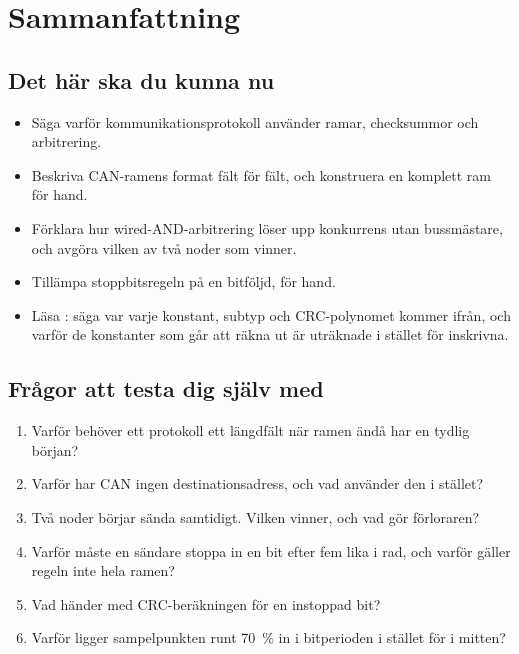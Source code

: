 
\section{Sammanfattning}
\label{c10:sec:review}

\subsection*{Det här ska du kunna nu}
\begin{itemize}
  \item Säga varför kommunikationsprotokoll använder ramar, checksummor och arbitrering.
  \item Beskriva CAN-ramens format fält för fält, och konstruera en komplett ram för hand.
  \item Förklara hur wired-AND-arbitrering löser upp konkurrens utan bussmästare, och avgöra vilken
    av två noder som vinner.
  \item Tillämpa stoppbitsregeln på en bitföljd, för hand.
  \item Läsa : säga var varje konstant, subtyp och CRC-polynomet kommer ifrån, och
    varför de konstanter som går att räkna ut är uträknade i stället för inskrivna.
\end{itemize}

\subsection*{Frågor att testa dig själv med}
\begin{enumerate}
  \item Varför behöver ett protokoll ett längdfält när ramen ändå har en tydlig början?
  \item Varför har CAN ingen destinationsadress, och vad använder den i stället?
  \item Två noder börjar sända samtidigt. Vilken vinner, och vad gör förloraren?
  \item Varför måste en sändare stoppa in en bit efter fem lika i rad, och varför gäller regeln inte
    hela ramen?
  \item Vad händer med CRC-beräkningen för en instoppad bit?
  \item Varför ligger sampelpunkten runt 70~\% in i bitperioden i stället för i mitten?
\end{enumerate}

